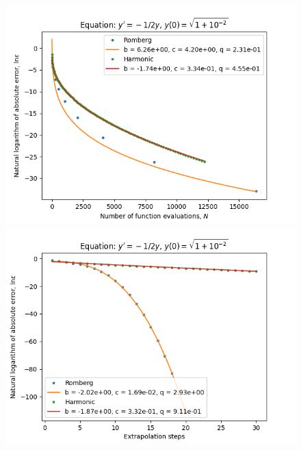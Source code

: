 \begin{figure}[H]
\centering
\begin{minipage}{0.45\textwidth}
\centering
\includegraphics[scale=0.45]{../results/emr_plots/quad_sing_2_hp_trend.png}
\end{minipage}
\begin{minipage}{0.45\textwidth}
\centering
\includegraphics[scale=0.45]{../results/emr_plots/quad_sing_2_hp_steps.png}
\end{minipage}
\end{figure}

